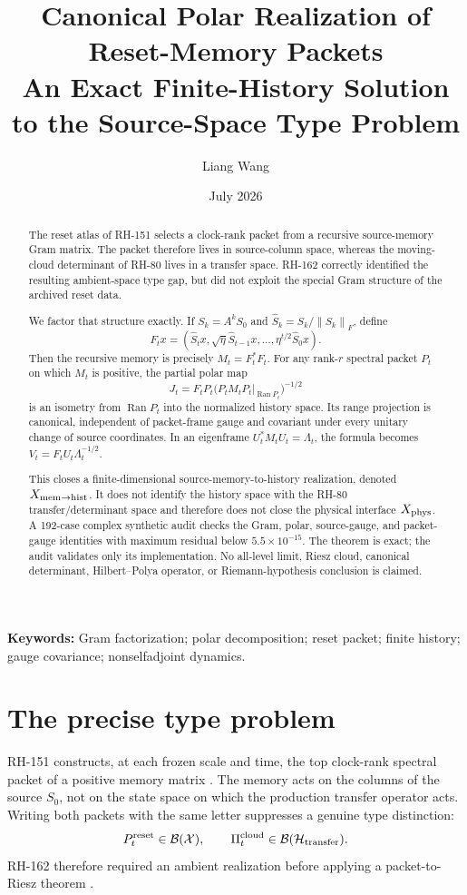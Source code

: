 \documentclass[12pt]{article}
\title{Canonical Polar Realization of Reset-Memory Packets\\
\large An Exact Finite-History Solution to the Source-Space Type Problem}
\author{Liang Wang}
\date{July 2026}
\theoremstyle{definition}
\theoremstyle{remark}
\newcommand{\cX}{\mathcal X}
\newcommand{\cH}{\mathcal H}
\newcommand{\Ran}{\operatorname{Ran}}
\newcommand{\norm}[1]{\left\lVert#1\right\rVert}
\begin{document}
\maketitle

\begin{abstract}
The reset atlas of RH-151 selects a clock-rank packet from a recursive
source-memory Gram matrix.  The packet therefore lives in source-column
space, whereas the moving-cloud determinant of RH-80 lives in a transfer
space.  RH-162 correctly identified the resulting ambient-space type gap,
but did not exploit the special Gram structure of the archived reset data.

We factor that structure exactly.  If $S_k=A^kS_0$ and
$\widehat S_k=S_k/\norm{S_k}_F$, define
\[
 F_t x=(\widehat S_t x,\sqrt\eta\widehat S_{t-1}x,
 \ldots,\eta^{t/2}\widehat S_0x).
\]
Then the recursive memory is precisely $M_t=F_t^*F_t$.  For any rank-$r$
spectral packet $P_t$ on which $M_t$ is positive, the partial polar map
\[
 J_t=F_tP_t\bigl(P_tM_tP_t|_{\Ran P_t}\bigr)^{-1/2}
\]
is an isometry from $\Ran P_t$ into the normalized history space.  Its range
projection is canonical, independent of packet-frame gauge and covariant
under every unitary change of source coordinates.  In an eigenframe
$U_t^*M_tU_t=\Lambda_t$, the formula becomes
$V_t=F_tU_t\Lambda_t^{-1/2}$.

This closes a finite-dimensional source-memory-to-history realization,
denoted $X_{\rm mem\to hist}$.  It does not identify the history space with
the RH-80 transfer/determinant space and therefore does not close the
physical interface $X_{\rm phys}$.  A 192-case complex synthetic audit
checks the Gram, polar, source-gauge, and packet-gauge identities with maximum
residual below $5.5\times10^{-15}$.  The theorem is exact; the audit validates
only its implementation.  No all-level limit, Riesz cloud, canonical
determinant, Hilbert--Polya operator, or Riemann-hypothesis conclusion is
claimed.
\end{abstract}

\noindent\textbf{Keywords:} Gram factorization; polar decomposition; reset
packet; finite history; gauge covariance; nonselfadjoint dynamics.

\section{The precise type problem}

RH-151 constructs, at each frozen scale and time, the top clock-rank spectral
packet of a positive memory matrix \citep{WangRH151}.  The memory acts on the
columns of the source $S_0$, not on the state space on which the production
transfer operator acts.  Writing both packets with the same letter suppresses
a genuine type distinction:
\[
 P_t^{\rm reset}\in\mathcal B(\cX),
 \qquad
 \Pi_t^{\rm cloud}\in\mathcal B(\cH_{\rm transfer}).
\]
RH-162 therefore required an ambient realization before applying a
packet-to-Riesz theorem \citep{WangRH162}.
\end{document}
